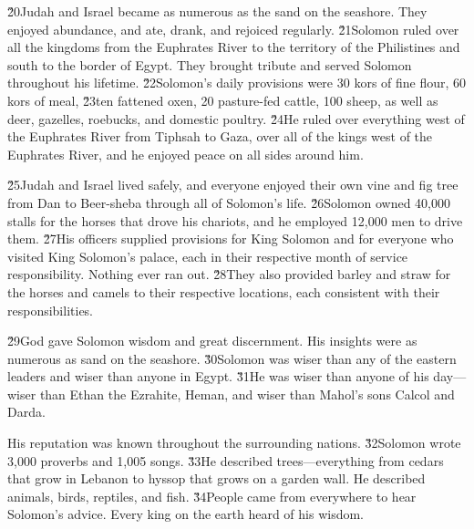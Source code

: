 \v{20}Judah and Israel became as numerous as the sand on the seashore. They enjoyed abundance, and ate, drank, and rejoiced regularly. \v{21}Solomon ruled over all the kingdoms from the Euphrates River to the territory of the Philistines and south to the border of Egypt. They brought tribute and served Solomon throughout his lifetime. \v{22}Solomon's daily provisions were 30 kors of fine flour, 60 kors of meal, \v{23}ten fattened oxen, 20 pasture-fed cattle, 100 sheep, as well as deer, gazelles, roebucks, and domestic poultry. \v{24}He ruled over everything west of the Euphrates River from Tiphsah to Gaza, over all of the kings west of the Euphrates River, and he enjoyed peace on all sides around him.

\v{25}Judah and Israel lived safely, and everyone enjoyed their own vine and fig tree from Dan to Beer-sheba through all of Solomon's life. \v{26}Solomon owned 40,000 stalls for the horses that drove his chariots, and he employed 12,000 men to drive them. \v{27}His officers supplied provisions for King Solomon and for everyone who visited King Solomon's palace, each in their respective month of service responsibility. Nothing ever ran out. \v{28}They also provided barley and straw for the horses and camels to their respective locations, each consistent with their responsibilities.

\v{29}God gave Solomon wisdom and great discernment. His insights were as numerous as sand on the seashore. \v{30}Solomon was wiser than any of the eastern leaders and wiser than anyone in Egypt. \v{31}He was wiser than anyone of his day---wiser than Ethan the Ezrahite, Heman, and wiser than Mahol's sons Calcol and Darda.

His reputation was known throughout the surrounding nations. \v{32}Solomon wrote 3,000 proverbs and 1,005 songs. \v{33}He described trees---everything from cedars that grow in Lebanon to hyssop that grows on a garden wall. He described animals, birds, reptiles, and fish. \v{34}People came from everywhere to hear Solomon's advice. Every king on the earth heard of his wisdom.

